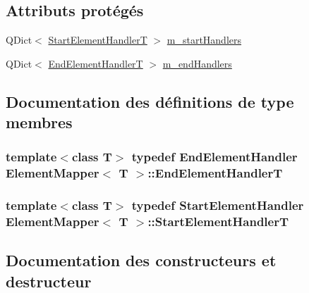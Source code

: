 \subsection*{Attributs protégés}
\begin{DoxyCompactItemize}
\item 
Q\+Dict$<$ \hyperlink{class_element_mapper_afca37050650c0a9d475f4c87b9189eac}{Start\+Element\+Handler\+T} $>$ \hyperlink{class_element_mapper_ac65b2d91a218457be0013a5b34ce6b60}{m\+\_\+start\+Handlers}
\item 
Q\+Dict$<$ \hyperlink{class_element_mapper_a3d3ef233834e26837676018b71f5d1aa}{End\+Element\+Handler\+T} $>$ \hyperlink{class_element_mapper_acc10714885fecc41c06efd87a3277b71}{m\+\_\+end\+Handlers}
\end{DoxyCompactItemize}


\subsection{Documentation des définitions de type membres}
\hypertarget{class_element_mapper_a3d3ef233834e26837676018b71f5d1aa}{}
\subsubsection[{End\+Element\+Handler\+T}]{\setlength{\rightskip}{0pt plus 5cm}template$<$class T$>$ typedef End\+Element\+Handler {\bf Element\+Mapper}$<$ T $>$\+::{\bf End\+Element\+Handler\+T}}\label{class_element_mapper_a3d3ef233834e26837676018b71f5d1aa}
\hypertarget{class_element_mapper_afca37050650c0a9d475f4c87b9189eac}{}
\subsubsection[{Start\+Element\+Handler\+T}]{\setlength{\rightskip}{0pt plus 5cm}template$<$class T$>$ typedef Start\+Element\+Handler {\bf Element\+Mapper}$<$ T $>$\+::{\bf Start\+Element\+Handler\+T}}\label{class_element_mapper_afca37050650c0a9d475f4c87b9189eac}


\subsection{Documentation des constructeurs et destructeur}
\hypertarget{class_element_mapper_a577e0935c5a56e7769cf629ee034bf58}{}
